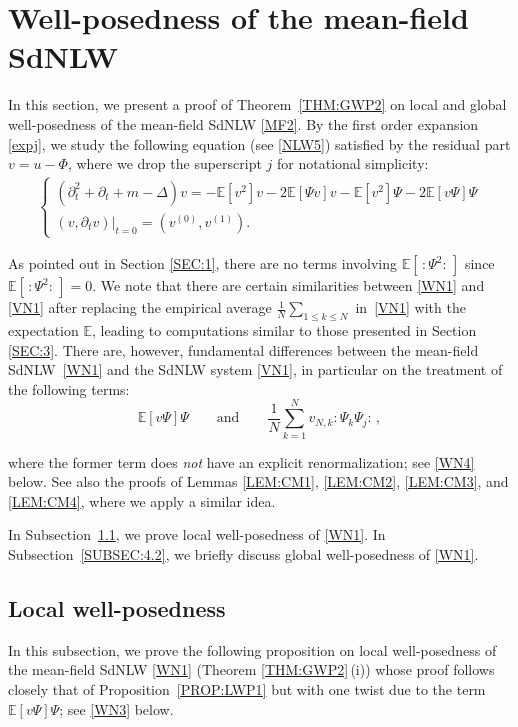 \documentclass[letterpaper, 11pt,  reqno]{amsart}
\newcommand{\1}{\hspace{0.5mm}\text{I}\hspace{0.2mm}}
\newcommand{\noi}{\noindent}
\newcommand{\E}{\mathbb{E}}
\newcommand{\dt}{\partial_t}
\newcommand{\wick}[1]{:\!{#1}\!:}
\numberwithin{equation}{section}
\numberwithin{theorem}{section}
\begin{document}
\section{Well-posedness of the mean-field SdNLW} 
\label{SEC:4}
In this section, we present a proof of  Theorem~\ref{THM:GWP2}
on local  and global well-posedness of the mean-field SdNLW \eqref{MF2}. By the first order expansion \eqref{expj}, 
we study the following  equation
(see \eqref{NLW5})
satisfied by the residual part $v = u - \Phi$, where  we drop the superscript $j$ 
for notational simplicity:
\begin{align} 
\begin{cases}
(\dt^2 + \dt + m - \Delta) v 
= 
 - \E [ v^2 ] v
 - 2 \E [ \Psi v ] v - \E [ v^2 ] \Psi
- 2 \E [ v \Psi ] \Psi \\
(v, \dt v)|_{t = 0} = (v^{(0)}, v^{(1)}). 
\end{cases}
\label{WN1} 
\end{align} 


\noi
As pointed out in Section \ref{SEC:1}, 
 there are no terms involving $\E[\, \wick{\Psi^2}\,]$
since $\E[ \,\wick{\Psi^2}\,] = 0$.
We note that there are certain similarities between \eqref{WN1} and \eqref{VN1}
after replacing the empirical average 
$\frac 1N \sum_{1 \leq k \leq N}$ in~\eqref{VN1}
with the expectation $\E$, 
leading to computations similar to those
presented in Section \ref{SEC:3}.
There are, however,  
fundamental differences
between
 the mean-field SdNLW~\eqref{WN1} and the SdNLW system
 \eqref{VN1}, in particular on  the treatment of the following terms: 
\[ \E [v\Psi ]\Psi
\qquad \text{and}\qquad  
\frac 1N \sum_{k = 1}^N v_{N,k} \wick{\Psi_k \Psi_j}\,,  \]


\noi
where the former term does {\it not} have an explicit renormalization;
see \eqref{WN4} below.
See also the proofs of Lemmas \ref{LEM:CM1}, \ref{LEM:CM2}, \ref{LEM:CM3}, and \ref{LEM:CM4}, 
where we apply a similar idea.

In Subsection~\ref{SUBSEC:4.1}, we prove local well-posedness of \eqref{WN1}. 
In Subsection~\ref{SUBSEC:4.2}, we briefly discuss 
global well-posedness of \eqref{WN1}.


 



\subsection{Local well-posedness} 
\label{SUBSEC:4.1}


In this subsection, 
we prove the following proposition on local well-posedness
of the mean-field SdNLW \eqref{WN1}
(Theorem \ref{THM:GWP2}\,(i))
whose proof  follows closely that of Proposition~\ref{PROP:LWP1}
but with one twist due to the term $\E[ v\Psi]\Psi$;
see \eqref{WN3} below.
\end{document}
